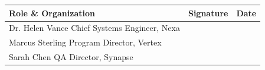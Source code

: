 \documentclass[10pt,letterpaper]{article}
\begin{document}
\vspace{0.4cm}
\noindent
\begin{tabularx}{\textwidth}{X X l}
\toprule
\textbf{Role \& Organization} & \textbf{Signature} & \textbf{Date} \\
\midrule
Dr. Helen Vance \newline Chief Systems Engineer, Nexa & & \\
\midrule
Marcus Sterling \newline Program Director, Vertex & & \\
\midrule
Sarah Chen \newline QA Director, Synapse & & \\
\bottomrule
\end{tabularx}
\end{document}
